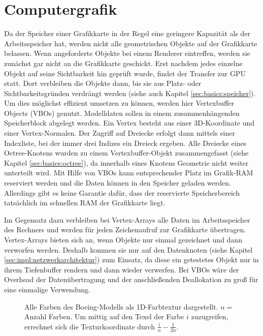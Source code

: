 \section{Computergrafik}
\label{sec:basics:computergrafik}
Da der Speicher einer Grafikkarte in der Regel eine geringere Kapazität als der Arbeitsspeicher hat, werden nicht alle geometrischen Objekte auf der Grafikkarte belassen. Wenn angeforderte Objekte bei einem Renderer eintreffen, werden sie zunächst gar nicht an die Grafikkarte geschickt. Erst nachdem jedes einzelne Objekt auf seine Sichtbarkeit hin geprüft wurde, findet der Transfer zur GPU statt. Dort verbleiben die Objekte dann, bis sie aus Platz- oder Sichtbarkeitsgründen verdrängt werden (siehe auch Kapitel \ref{sec:basics:speicher}). Um dies möglichst effizient umsetzen zu können, werden hier Vertexbuffer Objects (VBOs) genutzt. Modelldaten sollen in einem zusammenhängenden Speicherblock abgelegt werden. Ein Vertex besteht aus einer 3D-Koordinate und einer Vertex-Normalen. Der Zugriff auf Dreiecke erfolgt dann mittels einer Indexliste, bei der immer drei Indizes ein Dreieck ergeben. Alle Dreiecke eines Octree-Knotens wurden zu einem Vertexbuffer-Objekt zusammengefasst (siehe Kapitel \ref{sec:basics:octree}), da innerhalb eines Knotens Geometrie nicht weiter unterteilt wird. Mit Hilfe von VBOs kann entsprechender Platz im Grafik-RAM reserviert werden und die Daten können in den Speicher geladen werden. Allerdings gibt es keine Garantie dafür, dass der reservierte Speicherbereich tatsächlich im schnellen RAM der Grafikkarte liegt.


Im Gegensatz dazu verbleiben bei Vertex-Arrays alle Daten im Arbeitsspeicher des Rechners und werden für jeden Zeichenaufruf zur Grafikkarte übertragen. Vertex-Arrays bieten sich an, wenn Objekte nur einmal gezeichnet und dann verworfen werden. Deshalb kommen sie nur auf den Datenknoten (siehe Kapitel \ref{sec:impl:netzwerkarchitektur}) zum Einsatz, da diese ein getestetes Objekt nur in ihrem Tiefenbuffer rendern und dann wieder verwerfen. Bei VBOs wäre der Overhead der Datenübertragung und der anschließenden Deallokation zu groß für eine einmalige Verwendung.
\begin{figure}
  \centering
  
  \caption[Farb-Textur des Boeing-Modells.]{Alle Farben des Boeing-Modells als 1D-Farbtextur dargestellt. $n=$Anzahl Farben. Um mittig auf den Texel der Farbe $i$ zuzugreifen, errechnet sich die Texturkoordinate durch $\frac{i}{n}-\frac{1}{2n}$. }
  \label{fig:basics:1dtexture}
\end{figure}

